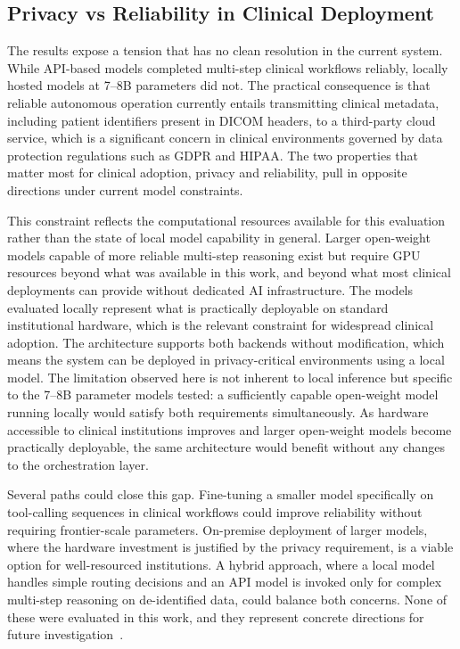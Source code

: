 \documentclass[conference]{IEEEtran}
\begin{document}
\subsection{Privacy vs Reliability in Clinical Deployment}

The results expose a tension that has no clean resolution in the current system. While API-based models completed multi-step clinical workflows reliably, locally hosted models at 7--8B parameters did not. The practical consequence is that reliable autonomous operation currently entails transmitting clinical metadata, including patient identifiers present in DICOM headers, to a third-party cloud service, which is a significant concern in clinical environments governed by data protection regulations such as GDPR and HIPAA. The two properties that matter most for clinical adoption, privacy and reliability, pull in opposite directions under current model constraints.

This constraint reflects the computational resources available for this evaluation rather than the state of local model capability in general. Larger open-weight models capable of more reliable multi-step reasoning exist but require GPU resources beyond what was available in this work, and beyond what most clinical deployments can provide without dedicated AI infrastructure. The models evaluated locally represent what is practically deployable on standard institutional hardware, which is the relevant constraint for widespread clinical adoption. The architecture supports both backends without modification, which means the system can be deployed in privacy-critical environments using a local model. The limitation observed here is not inherent to local inference but specific to the 7--8B parameter models tested: a sufficiently capable open-weight model running locally would satisfy both requirements simultaneously. As hardware accessible to clinical institutions improves and larger open-weight models become practically deployable, the same architecture would benefit without any changes to the orchestration layer.

Several paths could close this gap. Fine-tuning a smaller model specifically on tool-calling sequences in clinical workflows could improve reliability without requiring frontier-scale parameters. On-premise deployment of larger models, where the hardware investment is justified by the privacy requirement, is a viable option for well-resourced institutions. A hybrid approach, where a local model handles simple routing decisions and an API model is invoked only for complex multi-step reasoning on de-identified data, could balance both concerns. None of these were evaluated in this work, and they represent concrete directions for future investigation~\cite{trustworthyai2025, dietrich2025agentic, agiformedicalimaging2025}.
\end{document}
